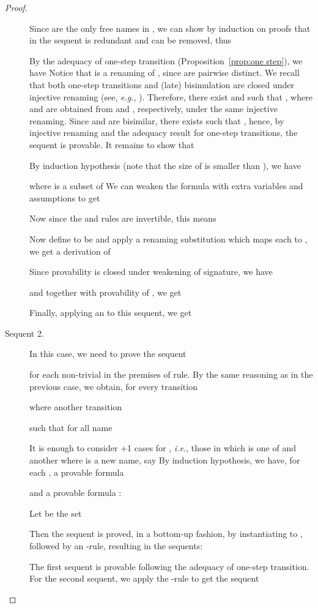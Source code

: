 \documentclass{acmtrans2m}
\newcommand{\ie}{{\em i.e.}}
\newcommand{\eg}{{\em e.g.}}
\begin{document}
\begin{proof}
\begin{description}
Since  are the only free names in , we can show by
induction on proofs that  in the sequent is redundant and can be removed,
thus 

By the adequacy of one-step transition (Proposition~\ref{prop:one step}),
we have
 Notice that  is a renaming of , since
 are pairwise distinct. We recall that both one-step
transitions and (late) bisimulation are closed under injective renaming 
(see, \eg, \cite{milner92icII}). Therefore, there exist  and  such that
, where  and  are obtained from  and , respectively,
under the same injective renaming. Since  and  are bisimilar, there exists
 such that , hence, by injective renaming and the adequacy
result for one-step transitions, the sequent 
 is provable. It remains to show
that 

By induction hypothesis (note that the size of  is smaller
than ), we have 

where  is a subset of 
We can weaken the formula with extra variables and assumptions to get

Now since the  and  rules are invertible, this means 

Now define  to be  and apply a renaming
substitution which maps each  to , we get a derivation of

Since provability is closed under weakening of signature, we have

and together with provability of 
, we get 

Finally, applying an  to this sequent, we get


\item[Sequent 2.]
In this case, we need to prove the sequent

for each non-trivial  in the premises of  rule. 
By the same reasoning as in the previous case, we obtain, for every transition

where  another transition

such that for all name 

It is enough to consider +1 cases for , \ie, those in which
 is one of  and another where  is a new name,
say 
By induction hypothesis, we have, for each , a provable formula


and a provable formula :

Let  be the set

Then the sequent  is proved, in a bottom-up fashion, by instantiating  to ,
followed by an -rule, resulting in the sequents:


The first sequent is provable following the adequacy of one-step transition.
For the second sequent, we apply the -rule to get the sequent


\end{description}
\end{proof}
\end{document}
